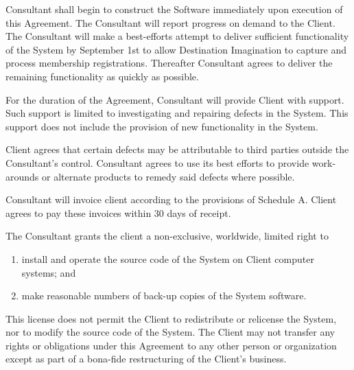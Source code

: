 \documentclass{tccontract}
\begin{document}
\begin{body}
Consultant shall begin to construct the Software immediately upon
execution of this Agreement. The Consultant will report progress on
demand to the Client. The Consultant will make a best-efforts attempt
to deliver sufficient functionality of the System by September 1st to
allow Destination Imagination to capture and process membership
registrations. Thereafter Consultant agrees to deliver the remaining
functionality as quickly as possible.

For the duration of the Agreement, Consultant will provide Client with
support. Such support is limited to investigating and repairing
defects in the System. This support does not include the provision of
new functionality in the System.

Client agrees that certain defects may be attributable to third
parties outside the Consultant's control.  Consultant agrees to use
its best efforts to provide work-arounds or alternate products to
remedy said defects where possible.


Consultant will invoice client according to the provisions of Schedule
A. Client agrees to pay these invoices within 30 days of receipt.


The Consultant grants the client a non-exclusive, worldwide, limited
right to

\begin{enumerate}
\item install and operate the source code of the System on Client
      computer
      systems; and
\item make reasonable numbers of back-up copies of the System
      software.
\end{enumerate}

This license does not permit the Client to redistribute or relicense
the System, nor to modify the source code of the System.  The Client
may not transfer any rights or obligations under this Agreement to any
other person or organization except as part of a bona-fide
restructuring of the Client's business.



\end{body}
\end{document}
